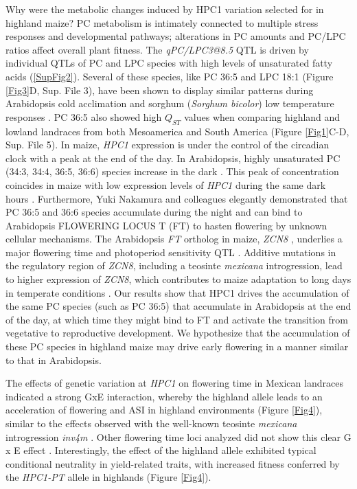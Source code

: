 \documentclass[9pt,twocolumn,twoside,lineno]{biorxiv}
\begin{document}
Why were the metabolic changes induced by HPC1 variation selected for in highland maize?
PC metabolism is intimately connected to multiple stress responses and developmental pathways; alterations in PC amounts and PC/LPC ratios affect overall plant fitness.
The \textit{qPC/LPC3@8.5} QTL is driven by individual QTLs of PC and LPC species with high levels of unsaturated fatty acids (\ref{SupFig2}).
Several of these species, like PC 36:5 and LPC 18:1 (Figure \ref{Fig3}D, Sup. File 3), have been shown to display similar patterns during Arabidopsis cold acclimation \cite{Welti2002-uk} and sorghum (\textit{Sorghum bicolor}) low temperature responses \cite{Marla2017-ph}.
PC 36:5 also showed high $Q_{ST}$ values when comparing highland and lowland landraces from both Mesoamerica and South America (Figure \ref{Fig1}C-D, Sup. File 5).
In maize, \textit{HPC1} expression is under the control of the circadian clock \cite{Khan2010-iv} with a peak at the end of the day. 
In Arabidopsis, highly unsaturated PC (34:3, 34:4, 36:5, 36:6) species increase in the dark \cite{Maatta2012-ip}. 
This peak of concentration coincides in maize with low expression levels of \textit{HPC1} during the same dark hours \cite{Khan2010-iv}.
Furthermore, Yuki Nakamura and colleagues elegantly demonstrated that PC 36:5 and 36:6 species accumulate during the night and can bind to Arabidopsis FLOWERING LOCUS T (FT) to hasten flowering \cite{Nakamura2014-qf} by unknown cellular mechanisms. 
The Arabidopsis \textit{FT} ortholog in maize, \textit{ZCN8} \cite{Lazakis2011-nq}, underlies a major flowering time and photoperiod sensitivity QTL \cite{Hung2012-ms}.
Additive mutations in the regulatory region of \textit{ZCN8}, including a teosinte \textit{mexicana} introgression, lead to higher expression of \textit{ZCN8}, which contributes to maize adaptation to long days in temperate conditions \cite{Guo2019-pn}.
Our results show that HPC1 drives the accumulation of the same PC species (such as PC 36:5) that accumulate in Arabidopsis at the end of the day, at which time they might bind to FT and activate the transition from vegetative to reproductive development. 
We hypothesize that the accumulation of these PC species in highland maize may drive early flowering in a manner similar to that in Arabidopsis. 

The effects of genetic variation at \textit{HPC1} on flowering time in Mexican landraces indicated a strong GxE interaction, whereby the highland allele leads to an acceleration of flowering and ASI in highland environments (Figure \ref{Fig4}), similar to the effects observed with the well-known teosinte \textit{mexicana} introgression \textit{inv4m} \cite{Crow2020-gene}.
Other flowering time loci analyzed did not show this clear G x E effect \cite{Gates2019-xu}.
Interestingly, the effect of the highland allele exhibited typical conditional neutrality in yield-related traits, with increased fitness conferred by the \textit{HPC1-PT} allele in highlands (Figure \ref{Fig4}).
\end{document}
